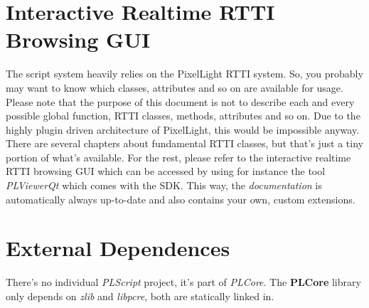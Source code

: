 \section{Interactive Realtime \ac{RTTI} Browsing \ac{GUI}}
The script system heavily relies on the PixelLight \ac{RTTI} system. So, you probably may want to know which classes, attributes and so on are available for usage. Please note that the purpose of this document is not to describe each and every possible global function, \ac{RTTI} classes, methods, attributes and so on. Due to the highly plugin driven architecture of PixelLight, this would be impossible anyway. There are several chapters about fundamental \ac{RTTI} classes, but that's just a tiny portion of what's available. For the rest, please refer to the interactive realtime \ac{RTTI} browsing \ac{GUI} which can be accessed by using for instance the tool \emph{PLViewerQt} which comes with the \ac{SDK}. This way, the \emph{documentation} is automatically always up-to-date and also contains your own, custom extensions.




\section{External Dependences}
There's no individual \emph{PLScript} project, it's part of \emph{PLCore}. The \textbf{PLCore} library only depends on \emph{zlib} and \emph{libpcre}, both are statically linked in.
